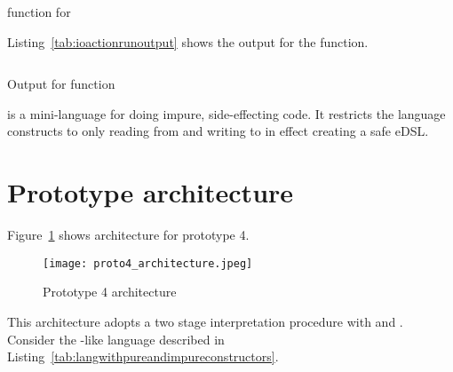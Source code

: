\documentclass[thesis-solanki.tex]{subfiles}
\begin{document}
\begin{code-list}[H]
\begin{singlespace}
\inputminted{haskell}{haskell-proto4-ioaction-run.hs}
\end{singlespace}
\caption{ function for }
\label{tab:ioactionrun}
\end{code-list}

Listing~\ref{tab:ioactionrunoutput} shows the output for the  function.

\begin{code-list}[H]
\begin{singlespace}
\inputminted{haskell}{haskell-proto4-ioaction-run-output.hs}
\end{singlespace}
\caption{Output for  function}
\label{tab:ioactionrunoutput}
\end{code-list}

 is a mini-language for doing impure, side-effecting code.
It restricts the language constructs to only reading from  and writing to
 in effect creating a safe eDSL.

\begin{comment}
\begin{code-list}[H]
\begin{singlespace}
  \inputminted[linenos]{haskell}{haskell-proto4-purvey-wincer.hs}
\end{singlespace}
\caption{\protect\haskellConstruct{IOAction} definitions}
\label{lis:IOAction}
\end{code-list}
\end{comment}

\newpage

\section{Prototype architecture}
Figure~\ref{fig:proto4architecture} shows architecture for prototype 4.

\begin{figure}[H]
  \centering
  \texttt{[image: proto4\_architecture.jpeg]}
  \caption{Prototype 4 architecture}
  \label{fig:proto4architecture}
\end{figure}

This architecture adopts a two stage interpretation procedure with  and . Consider the 
-like language described in Listing~\ref{tab:langwithpureandimpureconstructors}.
\end{document}
